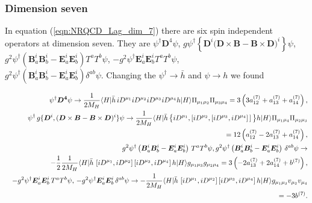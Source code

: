 \subsubsection{Dimension seven}
\vspace{-0.3cm}
In equation (\ref{eqn:NRQCD_Lag_dim_7}) there are six spin independent operators at dimension seven. They are $\psi^{\dagger} \bm{D}^{4} \psi$, $g \psi^{\dagger}\left\{\bm{D}^{i}(\bm{D} \times\right.\left.\bm{B}-\bm{B} \times \bm{D})^{i}\right\} \psi$, $g^{2} \psi^{\dagger}\left(\bm{B}_{a}^{i} \bm{B}_{b}^{i}-\bm{E}_{a}^{i} \bm{E}_{b}^{i}\right) T^{a} T^{b} \psi$, 
$-g^{2} \psi^{\dagger} \bm{E}_{a}^{i} \bm{E}_{b}^{i} T^{a} T^{b} \psi$,\\ $g^{2} \psi^{\dagger}\left(\bm{B}_{a}^{i} \bm{B}_{b}^{i}-\bm{E}_{a}^{i} \bm{E}_{b}^{i}\right) \delta^{a b} \psi$. Changing the $\psi^{\dagger}\to \bar{h}$ and $\psi\to h$ we found
\vspace{-0.1cm}

\begin{eqnarray}
&&\psi^\dagger \bm{D^4} \psi\to\dfrac1{2M_H}\langle H |\bar h\,  iD^{\mu_1}iD^{\mu_2} iD^{\mu_3}iD^{\mu_4} h|H\rangle\Pi_{\mu_1\mu_2}\Pi_{\mu_3\mu_4}=3\left(3a^{(7)}_{12} + a^{(7)}_{13} + a^{(7)}_{14}\right),\nonumber\\
&&\psi^\dagger\, g\{ \bm{D}^i , ( \bm{D} \times \bm{B} - \bm{B}\times \bm{D} )^i \} \psi\to\dfrac1{2M_H}\langle H |\bar h\, \big\{ iD^{\mu_1},\left[iD^{\mu_2},\left[ iD^{\mu_3},iD^{\mu_4}\right]\,\right]\big\} h|H\rangle\Pi_{\mu_1\mu_4}\Pi_{\mu_2\mu_3}\nonumber\\&&=12\left(a^{(7)}_{12} -2 a^{(7)}_{13} + a^{(7)}_{14}\right),\nonumber\\
&&g^2\psi^\dagger\left(\bm{B}_a^i\bm{B}_b^i - \bm{E}_a^i\bm{E}_b^i\right)\,T^aT^b \psi,g^2\psi^\dagger\left(\bm{B}_a^i\bm{B}_b^i - \bm{E}_a^i\bm{E}_b^i\right)\,\delta^{ab} \psi\to\nonumber\\
&&-\frac12\dfrac1{2M_H}\langle H |\bar h\,\left[iD^{\mu_1},iD^{\mu_2}\right]\left[ iD^{\mu_3},iD^{\mu_4}\right] h|H\rangle g_{\mu_1\mu_3}g_{\mu_2\mu_4}=
3\left(-2a^{(7)}_{13} +2 a^{(7)}_{14} +b^{(7)}\right),
\nonumber\\
&&-g^2\psi^\dagger\bm{E}_a^i\bm{E}_b^i\,T^aT^b\psi,\, -g^2\psi^\dagger\bm{E}_a^i\bm{E}_b^i\,\delta^{ab}\psi
\to-\dfrac1{2M_H}\langle H |\bar h\,\left[iD^{\mu_1},iD^{\mu_2}\right]\left[ iD^{\mu_3},iD^{\mu_4}\right] h|H\rangle g_{\mu_1\mu_3}v_{\mu_2}v_{\mu_4}\nonumber\\
&&=-3b^{(7)}.\nonumber\\
\vspace{2cm}
\end{eqnarray}

